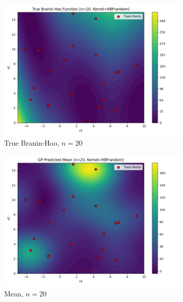 \documentclass[a4paper,12pt]{article}
\begin{document}
\begin{figure}[H]
\begin{subfigure}{0.3\textwidth}
  \includegraphics[width=\linewidth]{Task-02/images/true_function_rbf_n20_random.png}
  \caption{True Branin-Hoo, $n=20$}
\end{subfigure}
\begin{subfigure}{0.3\textwidth}
    \includegraphics[width=\linewidth]{Task-02/images/gp_mean_rbf_n20_random.png}
    \caption{Mean, $n=20$}
\end{subfigure}
\begin{subfigure}{0.3\textwidth}

\end{subfigure}
\end{figure}
\end{document}
